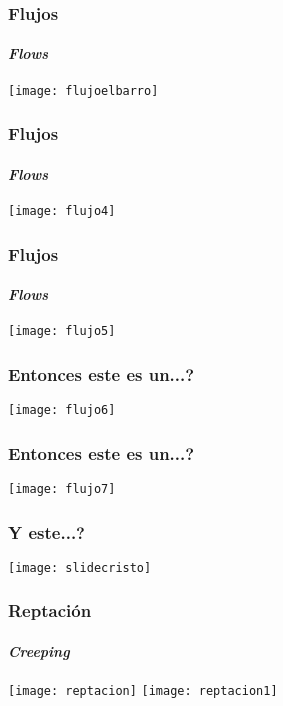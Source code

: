 \documentclass{beamer}
\begin{document}
\begin{frame}
\frametitle{Flujos}
\framesubtitle{\it{Flows}}
\begin{center}
   	\texttt{[image: flujoelbarro]} 
\end{center}
\end{frame}
\begin{frame}
\frametitle{Flujos}
\framesubtitle{\it{Flows}}
\begin{center}
   	\texttt{[image: flujo4]} 
\end{center}
\end{frame}
\begin{frame}
\frametitle{Flujos}
\framesubtitle{\it{Flows}}
\begin{center}
   	\texttt{[image: flujo5]} 
\end{center}
\end{frame}
\begin{frame}
\frametitle{Entonces este es un...?}
\begin{center}
   	\texttt{[image: flujo6]} 
\end{center}
\end{frame}
\begin{frame}
\frametitle{Entonces este es un...?}
\begin{center}
   	\texttt{[image: flujo7]} 
\end{center}
\end{frame}
\begin{frame}
\frametitle{Y este...?}
\begin{center}
   	\texttt{[image: slidecristo]} 
\end{center}
\end{frame}
\begin{frame}
\frametitle{Reptación}
\framesubtitle{\it{Creeping}}
\begin{center}
   	\texttt{[image: reptacion]}
   	\texttt{[image: reptacion1]}  
\end{center}
\end{frame}
\end{document}
